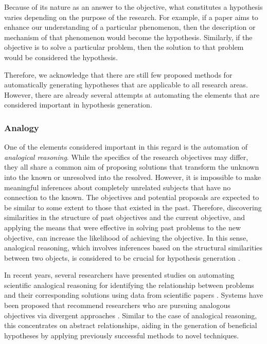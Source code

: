 \documentclass{book}
\begin{document}
Because of its nature as an answer to the objective, what constitutes a hypothesis varies depending on the purpose of the research. For example, if a paper aims to enhance our understanding of a particular phenomenon, then the description or mechanism of that phenomenon would become the hypothesis. Similarly, if the objective is to solve a particular problem, then the solution to that problem would be considered the hypothesis. 

Therefore, we acknowledge that there are still few proposed methods for automatically generating hypotheses that are applicable to all research areas. However, there are already several attempts at automating the elements that are considered important in hypothesis generation.

\subsubsection{Analogy} 

One of the elements considered important in this regard is the automation of \textit{analogical reasoning}. While the specifics of the research objectives may differ, they all share a common aim of proposing solutions that transform the unknown into the known or unresolved into the resolved. However, it is impossible to make meaningful inferences about completely unrelated subjects that have no connection to the known. The objectives and potential proposals are expected to be similar to some extent to those that existed in the past. Therefore, discovering similarities in the structure of past objectives and the current objective, and applying the means that were effective in solving past problems to the new objective, can increase the likelihood of achieving the objective. In this sense, analogical reasoning, which involves inferences based on the structural similarities between two objects, is considered to be crucial for hypothesis generation \cite{hesse1965models,thagard_1984,gentner1993shift,holyoak1996mental,dunbar1997scientists,gentner2002analogy}. 

In recent years, several researchers have presented studies on automating scientific analogical reasoning for identifying the relationship between problems and their corresponding solutions using data from scientific papers \cite{kang2022augmenting,chan2018solvent}. 
Systems have been proposed that recommend researchers who are pursuing analogous objectives via divergent approaches \cite{portenoy2022bursting}. Similar to the case of analogical reasoning, this concentrates on abstract relationships, aiding in the generation of beneficial hypotheses by applying previously successful methods to novel techniques.
\end{document}
